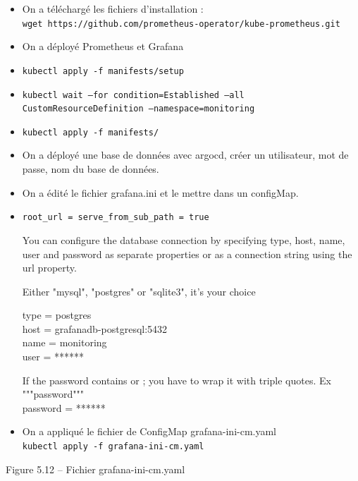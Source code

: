 \begin{itemize}

\item On a téléchargé les fichiers d’installation : \\
\texttt{wget https://github.com/prometheus-operator/kube-prometheus.git}

\item On a déployé Prometheus et Grafana

\end{itemize}
\begin{itemize}

\item \texttt{kubectl apply -f manifests/setup}
\item \texttt{kubectl wait --for condition=Established --all CustomResourceDefinition --namespace=monitoring}
\item \texttt{kubectl apply -f manifests/}

\item On a déployé une base de données avec argocd, créer un utilisateur, mot de passe, nom du base de données.

\item On a édité le fichier grafana.ini et le mettre dans un configMap.

\item \texttt{root\_url = serve\_from\_sub\_path = true}

You can configure the database connection by specifying type, host, name, user and password as separate properties or as a connection string using the url property.

Either "mysql", "postgres" or "sqlite3", it’s your choice

type = postgres \\
host = grafanadb-postgresql:5432 \\
name = monitoring \\
user = ******

If the password contains or ; you have to wrap it with triple quotes. Ex """password""" \\
password = ******

\item On a appliqué le fichier de ConfigMap grafana-ini-cm.yaml \\
\texttt{kubectl apply -f grafana-ini-cm.yaml}

\end{itemize}

\begin{center}
Figure 5.12 – Fichier grafana-ini-cm.yaml
\end{center}

